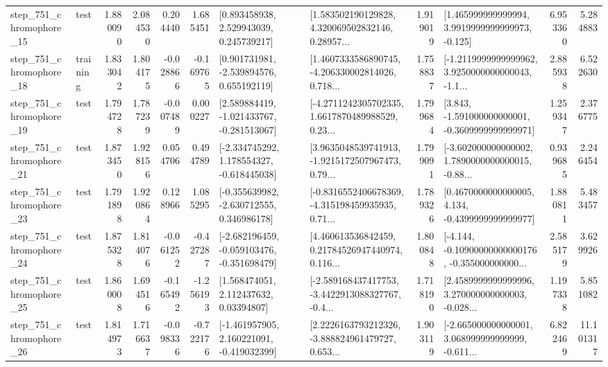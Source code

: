\begin{tabular}{llrrrrllrlrr}
  step\_751\_chromophore\_15 &      test &      1.880090 &    2.084530 &      0.204440 &  1.685451 &     [0.893458938, 2.529943039, 0.245739217] &  [1.583502190129828, 4.320069502832146, 0.28957... &       1.919019 &    [1.465999999999994, 3.9919999999999973, -0.125] &            6.953360 &          5.284883 \\
  step\_751\_chromophore\_18 &  training &      1.833042 &    1.804175 &     -0.028866 & -0.169765 &    [0.901731981, -2.539894576, 0.655192119] &  [1.4607333586890745, -4.206330002814026, 0.718... &       1.758837 &  [-1.2119999999999962, 3.9250000000000043, -1.1... &            2.885938 &          6.522630 \\
  step\_751\_chromophore\_19 &      test &      1.794728 &    1.787239 &     -0.007489 &  0.000227 &   [2.589884419, -1.021433767, -0.281513067] &  [-4.2711242305702335, 1.6617870489988529, 0.23... &       1.799684 &   [3.843, -1.591000000000001, -0.3609999999999971] &            1.259347 &          2.376775 \\
  step\_751\_chromophore\_21 &      test &      1.873450 &    1.928156 &      0.054706 &  0.494789 &   [-2.334745292, 1.178554327, -0.618445038] &  [3.9635048539741913, -1.9215172507967473, 0.79... &       1.799091 &  [-3.602000000000002, 1.7890000000000015, -0.88... &            0.939685 &          2.246454 \\
  step\_751\_chromophore\_23 &      test &      1.791898 &    1.920864 &      0.128966 &  1.085295 &   [-0.355639982, -2.630712555, 0.346986178] &  [-0.8316552406678369, -4.315198459935935, 0.71... &       1.789326 &   [0.4670000000000005, 4.134, -0.4399999999999977] &            1.880811 &          5.483457 \\
  step\_751\_chromophore\_24 &      test &      1.875328 &    1.814076 &     -0.061252 & -0.427287 &  [-2.682196459, -0.059103476, -0.351698479] &  [4.460613536842459, 0.21784526947440974, 0.116... &       1.800848 &  [-4.144, -0.10900000000000176, -0.355000000000... &            2.585179 &          3.629926 \\
  step\_751\_chromophore\_25 &      test &      1.860008 &    1.694516 &     -0.165492 & -1.256193 &      [1.568474051, 2.112437632, 0.03394807] &  [-2.589168437417753, -3.4422913088327767, -0.4... &       1.718190 &  [2.4589999999999996, 3.270000000000003, -0.028... &            1.197338 &          5.851082 \\
  step\_751\_chromophore\_26 &      test &      1.814973 &    1.716637 &     -0.098336 & -0.722176 &   [-1.461957905, 2.160221091, -0.419032399] &  [2.2226163793212326, -3.888824961479727, 0.653... &       1.903119 &  [-2.665000000000001, 3.068999999999999, -0.611... &            6.822469 &         11.101317 \\

\end{tabular}
